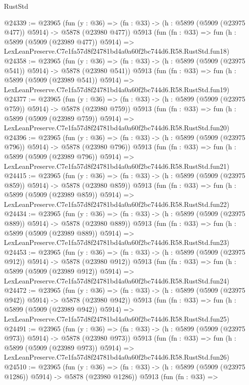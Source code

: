 \begin{lexlean}{RustStd}
\begin{coremodule}
{{@24339 := @23965
    (fun (y : @36) => (fn : @33) -> (h : @5899 (@5909 (@23975 @477)) @5914) -> @5878 (@23980 @477))
    @5913
    (fun (fn : @33) =>
    fun (h : @5899 (@5909 (@23989 @477)) @5914) =>
    LexLeanPreserve.C7e1fa57d8f24781bd4a0a60f2bc744d6.R58.RustStd.fun18)
@24358 := @23965
    (fun (y : @36) => (fn : @33) -> (h : @5899 (@5909 (@23975 @541)) @5914) -> @5878 (@23980 @541))
    @5913
    (fun (fn : @33) =>
    fun (h : @5899 (@5909 (@23989 @541)) @5914) =>
    LexLeanPreserve.C7e1fa57d8f24781bd4a0a60f2bc744d6.R58.RustStd.fun19)
@24377 := @23965
    (fun (y : @36) => (fn : @33) -> (h : @5899 (@5909 (@23975 @759)) @5914) -> @5878 (@23980 @759))
    @5913
    (fun (fn : @33) =>
    fun (h : @5899 (@5909 (@23989 @759)) @5914) =>
    LexLeanPreserve.C7e1fa57d8f24781bd4a0a60f2bc744d6.R58.RustStd.fun20)
@24396 := @23965
    (fun (y : @36) => (fn : @33) -> (h : @5899 (@5909 (@23975 @796)) @5914) -> @5878 (@23980 @796))
    @5913
    (fun (fn : @33) =>
    fun (h : @5899 (@5909 (@23989 @796)) @5914) =>
    LexLeanPreserve.C7e1fa57d8f24781bd4a0a60f2bc744d6.R58.RustStd.fun21)
@24415 := @23965
    (fun (y : @36) => (fn : @33) -> (h : @5899 (@5909 (@23975 @859)) @5914) -> @5878 (@23980 @859))
    @5913
    (fun (fn : @33) =>
    fun (h : @5899 (@5909 (@23989 @859)) @5914) =>
    LexLeanPreserve.C7e1fa57d8f24781bd4a0a60f2bc744d6.R58.RustStd.fun22)
@24434 := @23965
    (fun (y : @36) => (fn : @33) -> (h : @5899 (@5909 (@23975 @889)) @5914) -> @5878 (@23980 @889))
    @5913
    (fun (fn : @33) =>
    fun (h : @5899 (@5909 (@23989 @889)) @5914) =>
    LexLeanPreserve.C7e1fa57d8f24781bd4a0a60f2bc744d6.R58.RustStd.fun23)
@24453 := @23965
    (fun (y : @36) => (fn : @33) -> (h : @5899 (@5909 (@23975 @912)) @5914) -> @5878 (@23980 @912))
    @5913
    (fun (fn : @33) =>
    fun (h : @5899 (@5909 (@23989 @912)) @5914) =>
    LexLeanPreserve.C7e1fa57d8f24781bd4a0a60f2bc744d6.R58.RustStd.fun24)
@24472 := @23965
    (fun (y : @36) => (fn : @33) -> (h : @5899 (@5909 (@23975 @942)) @5914) -> @5878 (@23980 @942))
    @5913
    (fun (fn : @33) =>
    fun (h : @5899 (@5909 (@23989 @942)) @5914) =>
    LexLeanPreserve.C7e1fa57d8f24781bd4a0a60f2bc744d6.R58.RustStd.fun25)
@24491 := @23965
    (fun (y : @36) => (fn : @33) -> (h : @5899 (@5909 (@23975 @973)) @5914) -> @5878 (@23980 @973))
    @5913
    (fun (fn : @33) =>
    fun (h : @5899 (@5909 (@23989 @973)) @5914) =>
    LexLeanPreserve.C7e1fa57d8f24781bd4a0a60f2bc744d6.R58.RustStd.fun26)
@24510 := @23965
    (fun (y : @36) =>
    (fn : @33) -> (h : @5899 (@5909 (@23975 @1286)) @5914) -> @5878 (@23980 @1286))
    @5913
    (fun (fn : @33) =>
}}
\end{coremodule}
\end{lexlean}

